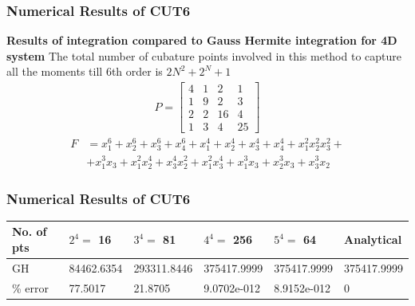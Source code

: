 \documentclass{beamer}
\begin{document}
\begin{frame}
\frametitle{Numerical Results of CUT6}
{\bf Results of integration compared to Gauss Hermite integration for 4D system}\newline
The total number of cubature points involved in this method to capture all the moments till 6th order is $2N^2+2^N+1$
\begin{align*}
 P = \begin{bmatrix}
       4 & 1 & 2  & 1   \\
       1 & 9 & 2  & 3   \\
       2 & 2 & 16 & 4  \\
       1 & 3 & 4 & 25  
     \end{bmatrix}
\end{align*}
\begin{align*}
F&=x_1^6+x_2^6+x_3^6+x_4^6+x_1^4+x_2^4+x_3^4+x_4^4+x_1^2x_2^2x_3^2+\\
&+x_1^3x_3+x_1^2x_2^4+x_3^4x_2^2+x_1^2x_3^4+x_1^3x_3+x_2^3x_3+x_3^3x_2
\end{align*}
\end{frame}
\begin{frame}
\frametitle{Numerical Results of CUT6}
\footnotesize
\begin{center}
\tiny
  \begin{tabular}{ | l | l | l | l | l | l | }
    \hline
 No. of pts   & $2^4=$ 16    & $3^4=$ 81 			& $4^4=$ 256		 & $5^4=$ 64 	  	      &   Analytical \\   \hline 
   GH        &   84462.6354  & 293311.8446    & 375417.9999    & 375417.9999          &   375417.9999  \\ \hline
\% error        	  &   77.5017    		&  21.8705  	  	& 9.0702e-012   & 8.9152e-012 &   0     \\        \hline 
  \end{tabular}
\end{center} 
\end{frame}
\end{document}
